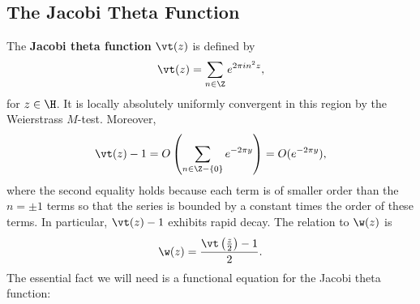     \subsection*{The Jacobi Theta Function}
      The \textbf{Jacobi theta function} $\vt(z)$ is defined by
      \[
        \vt(z) = \sum_{n \in \Z}e^{2\pi in^{2}z},
      \]
      for $z \in \H$. It is locally absolutely uniformly convergent in this region by the Weierstrass $M$-test. Moreover,
      \[
        \vt(z)-1 = O\left(\sum_{n \in \Z-\{0\}}e^{-2\pi y}\right) = O(e^{-2\pi y}),
      \]
      where the second equality holds because each term is of smaller order than the $n = \pm 1$ terms so that the series is bounded by a constant times the order of these terms. In particular, $\vt(z)-1$ exhibits rapid decay. The relation to $\w(z)$ is
      \begin{equation}\label{equ:omega_theta_relationship_for_zeta}
        \w(z) = \frac{\vt\left(\frac{z}{2}\right)-1}{2}.
      \end{equation}
      The essential fact we will need is a functional equation for the Jacobi theta function:

